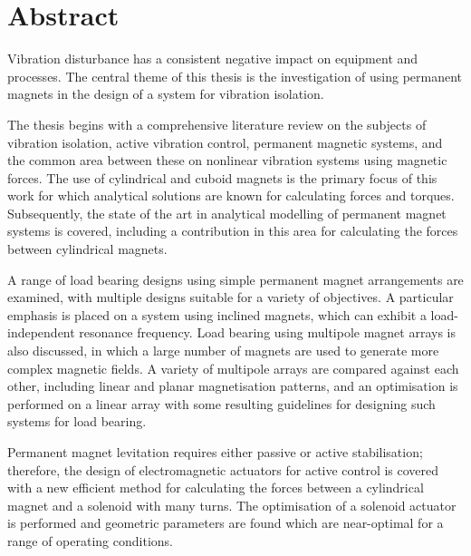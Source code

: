 \documentclass[10pt,a4paper]{memoir}
\def\standaloneabstract{}
\begin{document}
\ifx\standaloneabstract\undefined

  \section*{Abstract}

\else



  \bigskip
  
  \expandafter\noindent
\fi
\small
Vibration disturbance has a consistent negative impact on equipment and processes.
The central theme of this thesis is the investigation of using permanent magnets in the design of a system for vibration isolation.

The thesis begins with a comprehensive literature review on the subjects of vibration isolation, active vibration control, permanent magnetic systems, and the common area between these on nonlinear vibration systems using magnetic forces.
The use of cylindrical and cuboid magnets is the primary focus of this work for which analytical solutions are known for calculating forces and torques.
Subsequently, the state of the art in analytical modelling of permanent magnet systems is covered, including a contribution in this area for calculating the forces between cylindrical magnets.

A range of load bearing designs using simple permanent magnet arrangements are examined, with multiple designs suitable for a variety of objectives.
A particular emphasis is placed on a system using inclined magnets, which can exhibit a load-independent resonance frequency.
Load bearing using multipole magnet arrays is also discussed, in which a large number of magnets are used to generate more complex magnetic fields.
A variety of multipole arrays are compared against each other, including linear and planar magnetisation patterns, and an optimisation is performed on a linear array with some resulting guidelines for designing such systems for load bearing.

Permanent magnet levitation requires either passive or active stabilisation; therefore, the design of electromagnetic actuators for active control is covered with a new efficient method for calculating the forces between a cylindrical magnet and a solenoid with many turns.
The optimisation of a solenoid actuator is performed and geometric parameters are found which are near-optimal for a range of operating conditions.
\end{document}
